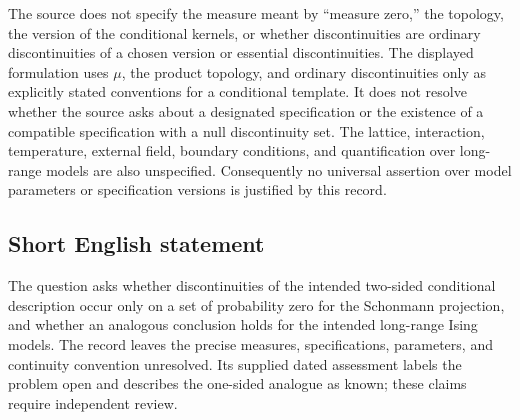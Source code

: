 \documentclass[11pt]{article}
\begin{document}
The source does not specify the measure meant by ``measure zero,'' the topology, the version of the conditional kernels, or whether discontinuities are ordinary discontinuities of a chosen version or essential discontinuities. The displayed formulation uses \(\mu\), the product topology, and ordinary discontinuities only as explicitly stated conventions for a conditional template. It does not resolve whether the source asks about a designated specification or the existence of a compatible specification with a null discontinuity set. The lattice, interaction, temperature, external field, boundary conditions, and quantification over long-range models are also unspecified. Consequently no universal assertion over model parameters or specification versions is justified by this record.
\subsection{Short English statement}
The question asks whether discontinuities of the intended two-sided conditional description occur only on a set of probability zero for the Schonmann projection, and whether an analogous conclusion holds for the intended long-range Ising models. The record leaves the precise measures, specifications, parameters, and continuity convention unresolved. Its supplied dated assessment labels the problem open and describes the one-sided analogue as known; these claims require independent review.
\end{document}
